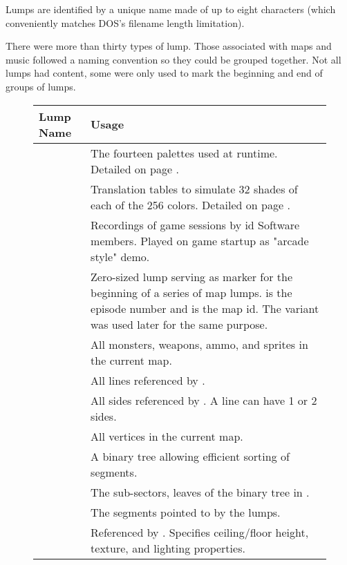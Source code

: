 Lumps are identified by a unique name made of up to eight characters (which conveniently matches DOS's filename length limitation).\\
\par
{}
\par
There were more than thirty types of lump. Those associated with maps and music followed a naming convention so they could be grouped together. Not all lumps had content, some were only used to mark the beginning and end of groups of lumps.
\pagebreak

\begin{figure}[H]
\centering  
\begin{tabularx}{\textwidth}{ L{0.2}  L{0.8}}
  \toprule
  \textbf{Lump Name} &  \textbf{Usage} \\
   
  \toprule 
   & The fourteen palettes used at runtime. Detailed on page \pageref{label_palettes}. \\
   & Translation tables to simulate 32 shades of each of the 256 colors. Detailed on page \pageref{diminishedlightning}. \\
   &  Recordings of game sessions by id Software members. Played on game startup as "arcade style" demo.\\
  \toprule
   & Zero-sized lump serving as marker for the beginning of a series of map lumps.  is the episode number and  is the map id. The  variant was used later for the same purpose.\\
   & All monsters, weapons, ammo, and sprites in the current map.\\
   & All lines referenced by .\\
   & All sides referenced by . A line can have 1 or 2 sides.\\
   & All vertices in the current map.\\
   & A binary tree allowing efficient sorting of segments. \\
   &  The sub-sectors, leaves of the binary tree in .  \\
   &  The segments pointed to by the  lumps.\\
   &  Referenced by . Specifies ceiling/floor height, texture, and lighting properties.\\
  

\end{tabularx}
\end{figure}
